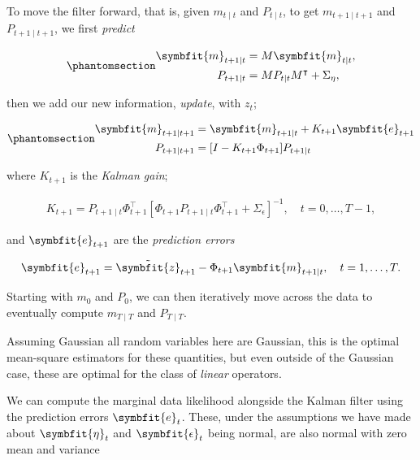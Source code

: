 \documentclass[
]{report}
\newcommand{\bv}[1]{\symbfit{#1}}
\theoremstyle{plain}
\theoremstyle{plain}
\theoremstyle{plain}
\theoremstyle{remark}
\begin{document}
To move the filter forward, that is, given \(m_{t\mid t}\) and
\(P_{t\mid t}\), to get \(m_{t+1\mid t+1}\) and \(P_{t+1\mid t+1}\), we
first \emph{predict}

\begin{equation}\phantomsection\label{eq-kalman-predict}{\begin{split}
\bv m_{t+1\mid t} &= M \bv m_{t\mid t},\\
P_{t+1\mid t} &= M P_{t\mid t} M^\intercal + \Sigma_\eta,
\end{split}
}\end{equation}

then we add our new information, \emph{update}, with \(z_{t}\);

\begin{equation}\phantomsection\label{eq-kalman-update}{\begin{split}
\bv m_{t+1\mid t+1} &= \bv m_{t+1\mid t} + K_{t+1} \bv e_{t+1}\\
P_{t+1\mid t+1} &= [I- K_{t+1}\Phi_{t+1}]P_{t+1\mid t}
\end{split} 
}\end{equation}

where \(K_{t+1}\) is the \emph{Kalman gain};

\[\begin{split}
K_{t+1} = P_{t+1\mid t}\Phi_{t+1}^\intercal [\Phi_{t+1} P_{t+1\mid t} \Phi_{t+1}^\intercal + \Sigma_\epsilon]^{-1}, \quad t=0,\dots,T-1,
\end{split}
\]

and \(\bv e_{t+1}\) are the \emph{prediction errors}

\[\begin{split}
\bv e_{t+1} = \tilde{\bv z}_{t+1}-\Phi_{t+1} \bv m_{t+1\mid t}, \quad t=1,\dots,T.
\end{split}
\]

Starting with \(m_0\) and \(P_0\), we can then iteratively move across
the data to eventually compute \(m_{T\mid T}\) and \(P_{T\mid T}\).

Assuming Gaussian all random variables here are Gaussian, this is the
optimal mean-square estimators for these quantities, but even outside of
the Gaussian case, these are optimal for the class of \emph{linear}
operators.

We can compute the marginal data likelihood alongside the Kalman filter
using the prediction errors \(\bv e_t\). These, under the assumptions we
have made about \(\bv \eta_t\) and \(\bv\epsilon_t\) being normal, are
also normal with zero mean and variance
\end{document}
